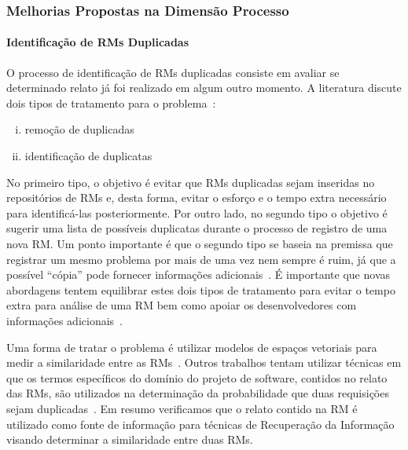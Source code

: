 \subsubsection{Melhorias Propostas na Dimensão Processo}\label{ssub:melhorias_dim_processo}

\paragraph{Identificação de RMs Duplicadas}

O processo de identificação de RMs duplicadas consiste em avaliar se
determinado relato já foi realizado em algum outro momento. A literatura
discute dois tipos de tratamento para o problema~\cite{kaushik2012comparative,
    Tian2012}:

\begin{enumerate}[(i)]

	\item remoção de duplicadas

	\item identificação de duplicatas

\end{enumerate}

No primeiro tipo, o objetivo é evitar que RMs duplicadas sejam inseridas no
repositórios de RMs e, desta forma, evitar o esforço e o tempo extra necessário
para identificá-las posteriormente. Por outro lado, no segundo tipo o objetivo
é sugerir uma lista de possíveis duplicatas durante o processo de registro de
uma nova RM\@. Um ponto importante é que o segundo tipo se baseia na premissa
que registrar um mesmo problema por mais de uma vez nem sempre é ruim, já que a
possível ``cópia'' pode fornecer informações
adicionais~\cite{bettenburg2008duplicate}. É importante que novas abordagens
tentem equilibrar estes dois tipos de tratamento para evitar o tempo extra para
análise de uma RM bem como apoiar os desenvolvedores com informações
adicionais~\cite{Lerch:2013:FDY:2495256.2495763,Thung2014}.

Uma forma de tratar o problema é utilizar modelos de espaços vetoriais para
medir a similaridade entre as RMs~\cite{liu2014faceted, sun2010discriminative,
    Thung2014,tomavsev2013exploiting}. Outros trabalhos tentam utilizar técnicas
em que os termos específicos do domínio do projeto de software, contidos no
relato das RMs, são utilizados na determinação da probabilidade que duas
requisições sejam duplicadas~\cite{hindle2016contextual, alipour2013contextual}.
Em resumo verificamos que o relato contido na RM é utilizado como fonte de
informação para técnicas de Re\-cu\-pe\-ra\-ção da Informação visando determinar
a similaridade entre duas RMs.

